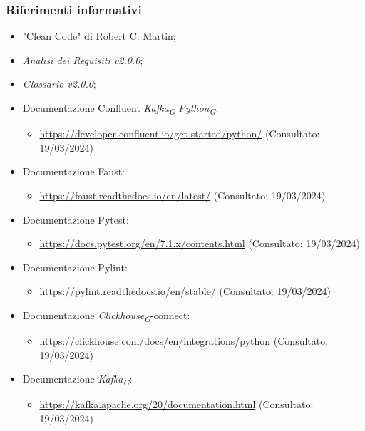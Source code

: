 \subsubsection{Riferimenti informativi}
\begin{itemize}
    \item "Clean Code" di Robert C. Martin;
    \item \textit{Analisi dei Requisiti v2.0.0};
    \item \textit{Glossario v2.0.0};
    \item Documentazione Confluent \textit{Kafka}\textsubscript{\textit{G}} \textit{Python}\textsubscript{\textit{G}}:
    \begin{itemize}
        \item \url{https://developer.confluent.io/get-started/python/} (Consultato: 19/03/2024)
    \end{itemize}
    \item Documentazione Faust: 
    \begin{itemize}
        \item \url{https://faust.readthedocs.io/en/latest/} (Consultato: 19/03/2024)
    \end{itemize}
    \item Documentazione Pytest: 
    \begin{itemize}
        \item \url{https://docs.pytest.org/en/7.1.x/contents.html} (Consultato: 19/03/2024)
    \end{itemize}
    \item Documentazione Pylint: 
    \begin{itemize}
        \item \url{https://pylint.readthedocs.io/en/stable/} (Consultato: 19/03/2024)
    \end{itemize}
    \item Documentazione \textit{Clickhouse}\textsubscript{\textit{G}}-connect: 
    \begin{itemize}
        \item \url{https://clickhouse.com/docs/en/integrations/python} (Consultato: 19/03/2024)
    \end{itemize}
    \item Documentazione \textit{Kafka}\textsubscript{\textit{G}}: 
    \begin{itemize}
        \item \url{https://kafka.apache.org/20/documentation.html} (Consultato: 19/03/2024)
    \end{itemize}

\end{itemize}

